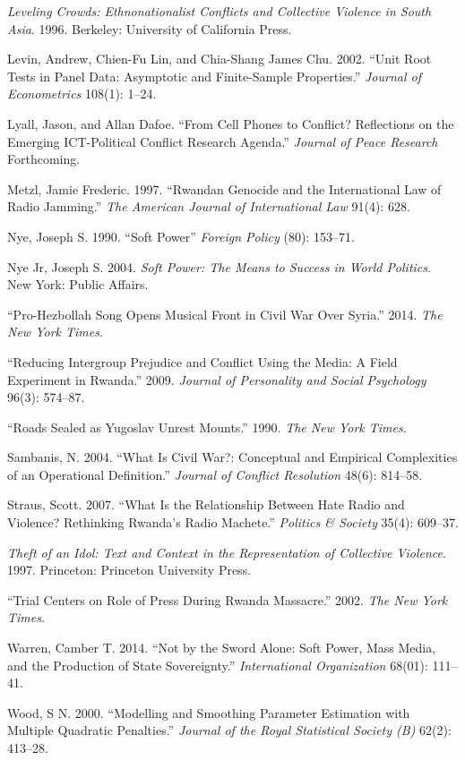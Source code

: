 \documentclass[11pt,article,oneside]{memoir}
\begin{document}
\emph{Leveling Crowds: Ethnonationalist Conflicts and Collective
Violence in South Asia}. 1996. Berkeley: University of California Press.

Levin, Andrew, Chien-Fu Lin, and Chia-Shang James Chu. 2002. ``Unit Root
Tests in Panel Data: Asymptotic and Finite-Sample Properties.''
\emph{Journal of Econometrics} 108(1): 1--24.

Lyall, Jason, and Allan Dafoe. ``From Cell Phones to Conflict?
Reflections on the Emerging ICT-Political Conflict Research Agenda.''
\emph{Journal of Peace Research} Forthcoming.

Metzl, Jamie Frederic. 1997. ``Rwandan Genocide and the International
Law of Radio Jamming.'' \emph{The American Journal of International Law}
91(4): 628.

Nye, Joseph S. 1990. ``Soft Power'' \emph{Foreign Policy} (80): 153--71.

Nye Jr, Joseph S. 2004. \emph{Soft Power: The Means to Success in World
Politics}. New York: Public Affairs.

``Pro-Hezbollah Song Opens Musical Front in Civil War Over Syria.''
2014. \emph{The New York Times}.

``Reducing Intergroup Prejudice and Conflict Using the Media: A Field
Experiment in Rwanda.'' 2009. \emph{Journal of Personality and Social
Psychology} 96(3): 574--87.

``Roads Sealed as Yugoslav Unrest Mounts.'' 1990. \emph{The New York
Times}.

Sambanis, N. 2004. ``What Is Civil War?: Conceptual and Empirical
Complexities of an Operational Definition.'' \emph{Journal of Conflict
Resolution} 48(6): 814--58.

Straus, Scott. 2007. ``What Is the Relationship Between Hate Radio and
Violence? Rethinking Rwanda's Radio Machete.'' \emph{Politics \&
Society} 35(4): 609--37.

\emph{Theft of an Idol: Text and Context in the Representation of
Collective Violence}. 1997. Princeton: Princeton University Press.

``Trial Centers on Role of Press During Rwanda Massacre.'' 2002.
\emph{The New York Times}.

Warren, Camber T. 2014. ``Not by the Sword Alone: Soft Power, Mass
Media, and the Production of State Sovereignty.'' \emph{International
Organization} 68(01): 111--41.

Wood, S N. 2000. ``Modelling and Smoothing Parameter Estimation with
Multiple Quadratic Penalties.'' \emph{Journal of the Royal Statistical
Society (B)} 62(2): 413--28.
\end{document}
